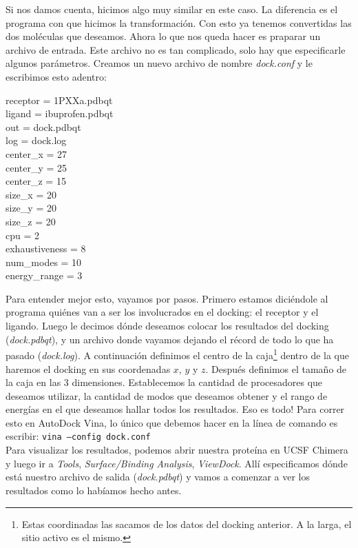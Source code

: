 \documentclass[10pt,letterpaper]{article}
\newcommand{\inlinecode}[1]{
\colorbox{light-gray}{\texttt{#1}}
}
\newenvironment{Code}
{
\begin{lrbox}{\selvestebox}%
\begin{minipage}{\dimexpr\columnwidth-2\fboxsep\relax}
\fontfamily{\ttdefault}\selectfont
}
{\end{minipage}\end{lrbox}%
\begin{center}
\colorbox{light-gray}{\usebox{\selvestebox}}
\end{center}
}
\begin{document}
Si nos damos cuenta, hicimos algo muy similar en este caso. La diferencia es el programa con que hicimos la transformaci\'on. Con esto ya tenemos convertidas las dos mol\'eculas que deseamos. Ahora lo que nos queda hacer es praparar un archivo de entrada. Este archivo no es tan complicado, solo hay que especificarle algunos par\'ametros. Creamos un nuevo archivo de nombre \emph{dock.conf} y le escribimos esto adentro:

\begin{Code}
receptor = 1PXXa.pdbqt\\
ligand = ibuprofen.pdbqt\\
out = dock.pdbqt\\
log = dock.log\\
center\_x = 27\\
center\_y = 25\\
center\_z = 15\\
size\_x = 20\\
size\_y = 20\\
size\_z = 20\\
cpu = 2\\
exhaustiveness = 8\\
num\_modes = 10\\
energy\_range = 3
\end{Code}

Para entender mejor esto, vayamos por pasos. Primero estamos dici\'endole al programa qui\'enes van a ser los involucrados en el docking: el receptor y el ligando. Luego le decimos d\'onde deseamos colocar los resultados del docking (\emph{dock.pdbqt}), y un archivo donde vayamos dejando el r\'ecord de todo lo que ha pasado (\emph{dock.log}). A continuaci\'on definimos el centro de la caja\footnote{Estas coordinadas las sacamos de los datos del docking anterior. A la larga, el sitio activo es el mismo.} dentro de la que haremos el docking en sus coordenadas $x$, $y$ y $z$. Despu\'es definimos el tama\~no de la caja en las 3 dimensiones. Establecemos la cantidad de procesadores que deseamos utilizar, la cantidad de modos que deseamos obtener y el rango de energ\'ias en el que deseamos hallar todos los resultados. Eso es todo! Para correr esto en AutoDock Vina, lo \'unico que debemos hacer en la l\'inea de comando es escribir: \inlinecode{vina --config dock.conf}\\

Para visualizar los resultados, podemos abrir nuestra prote\'ina en UCSF Chimera y luego ir a \emph{Tools}, \emph{Surface/Binding Analysis}, \emph{ViewDock}. All\'i especificamos d\'onde est\'a nuestro archivo de salida (\emph{dock.pdbqt}) y vamos a comenzar a ver los resultados como lo hab\'iamos hecho antes.\\
\end{document}
